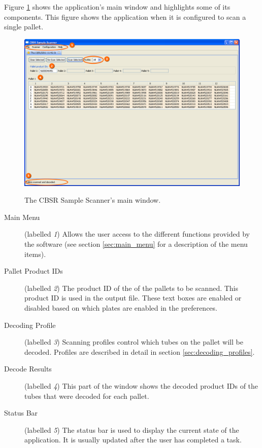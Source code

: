 Figure \ref{fig:main_window} shows the application's main window and highlights
some of its components. This figure shows the application when it is configured
to scan a single pallet.
\begin{figure}[H]
  \centering
  \scalebox{0.35}
	   { \includegraphics*{screenshots/overview/main_window} }
	   \caption{The CBSR Sample Scanner's main window.}
	   \label{fig:main_window}
\end{figure}
\begin{description}
\item[Main Menu] (labelled \emph{1}) Allows the user access to the
  different functions provided by the software (see section \ref{sec:main_menu}
  for a description of the menu items).
\item [Pallet Product IDs] (labelled \emph{2}) The product ID of the of the
  pallets to be scanned. This product ID is used in the output file. These text
  boxes are enabled or disabled based on which plates are enabled in the
  preferences.
\item [Decoding Profile] (labelled \emph{3}) Scanning profiles control which
  tubes on the pallet will be decoded. Profiles are described in detail in
  section \ref{sec:decoding_profiles}.
\item [Decode Results] (labelled \emph{4}) This part of the window shows the
  decoded product IDs of the tubes that were decoded for each pallet.
\item [Status Bar] (labelled \emph{5}) The status bar is used to display the
  current state of the application. It is usually updated after the user has
  completed a task.
\end{description}

